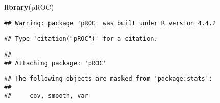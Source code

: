 \documentclass[
]{article}
\newenvironment{Shaded}{\begin{snugshade}}{\end{snugshade}}
\newcommand{\FunctionTok}[1]{\textcolor[rgb]{0.13,0.29,0.53}{\textbf{#1}}}
\newcommand{\NormalTok}[1]{#1}
\begin{document}
\begin{Shaded}
\begin{Highlighting}[]
\FunctionTok{library}\NormalTok{(pROC)}
\end{Highlighting}
\end{Shaded}

\begin{verbatim}
## Warning: package 'pROC' was built under R version 4.4.2
\end{verbatim}

\begin{verbatim}
## Type 'citation("pROC")' for a citation.
\end{verbatim}

\begin{verbatim}
## 
## Attaching package: 'pROC'
\end{verbatim}

\begin{verbatim}
## The following objects are masked from 'package:stats':
## 
##     cov, smooth, var
\end{verbatim}
\end{document}
